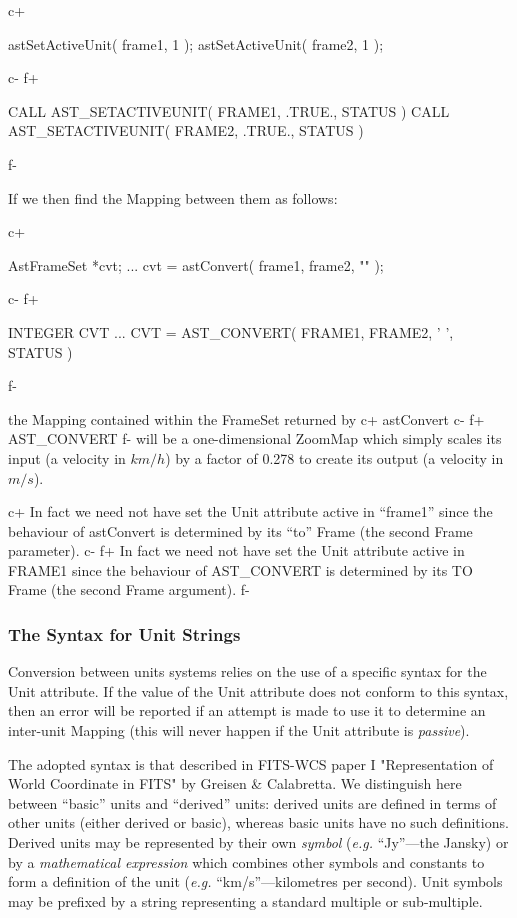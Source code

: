 \documentclass[twoside,11pt]{starlink}
\begin{document}
c+
\small
\begin{terminalv}
astSetActiveUnit( frame1, 1 );
astSetActiveUnit( frame2, 1 );
\end{terminalv}
\normalsize
c-
f+
\small
\begin{terminalv}
      CALL AST_SETACTIVEUNIT( FRAME1, .TRUE., STATUS )
      CALL AST_SETACTIVEUNIT( FRAME2, .TRUE., STATUS )
\end{terminalv}
\normalsize
f-

If we then find the Mapping between them as follows:

c+
\small
\begin{terminalv}
AstFrameSet *cvt;
...
cvt = astConvert( frame1, frame2, "" );
\end{terminalv}
\normalsize
c-
f+
\small
\begin{terminalv}
      INTEGER CVT
      ...
      CVT = AST_CONVERT( FRAME1, FRAME2, ' ', STATUS )
\end{terminalv}
\normalsize
f-

the Mapping contained within the FrameSet returned by
c+
astConvert
c-
f+
AST\_CONVERT
f-
will be a one-dimensional ZoomMap which simply scales its input (a
velocity in $km/h$) by a factor of 0.278 to create its output (a velocity
in $m/s$).

c+
In fact we need not have set the Unit attribute active in ``frame1''
since the behaviour of astConvert is determined by its ``to'' Frame
(the second Frame parameter).
c-
f+
In fact we need not have set the Unit attribute active in FRAME1
since the behaviour of AST\_CONVERT is determined by its TO Frame
(the second Frame argument).
f-

\subsubsection{\label{ss:unitsyntax}The Syntax for Unit Strings}
Conversion between units systems relies on the use of a specific syntax
for the Unit attribute. If the value of the Unit attribute does not
conform to this syntax, then an error will be reported if an attempt is
made to use it to determine an inter-unit Mapping (this will never happen
if the Unit attribute is \emph{passive}).

The adopted syntax is that described in FITS-WCS paper I "Representation
of World Coordinate in FITS" by Greisen \& Calabretta. We distinguish
here between ``basic'' units and ``derived'' units: derived units are
defined in terms of other units (either derived or basic), whereas basic
units have no such definitions. Derived units may be represented by their
own \emph{symbol} (\emph{e.g.} ``Jy''---the Jansky) or by a
\emph{mathematical expression} which combines other symbols and constants
to form a definition of the unit (\emph{e.g.} ``km/s''---kilometres per
second). Unit symbols may be prefixed by a string representing a standard
multiple or sub-multiple.
\end{document}
